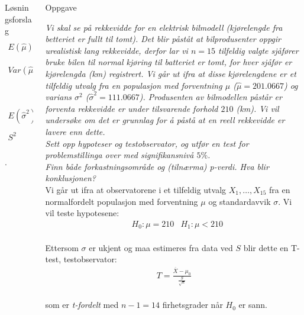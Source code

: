 \documentclass[final,hyperref={pdfpagelabels=false}]{beamer}
\newcommand{\oppgave}[2]
{\center\normalsize Oppgave\\
	{\footnotesize\raggedright \textit{#1}\\#2\\}}
\newcommand{\maths}[1]{\vspace{-3mm}\begin{align*}#1\end{align*}\\\vspace{-3mm}}
\begin{document}
\begin{frame}{}
\begin{columns}[t]
\begin{column}{.33\linewidth}
\begin{block}{Løsningsforslag}
				{\maths{E(\hat\mu)&=E\left(\frac{\sum_{i=1}^nl_iY_i}{\sum_{i=1}^nl_i}\right)=\frac{\sum_{i=1}^nl_iE(Y_i)}{\sum_{i=1}^nl_i}=\frac{\sum_{i=1}^nl_i\mu}{\sum_{i=1}^nl_i}=\mu\frac{\sum_{i=1}^nl_i}{\sum_{i=1}^nl_i}=\mu\\
						Var(\hat\mu)&=Var\left(\frac{\sum_{i=1}^nl_iY_i}{\sum_{i=1}^nl_i}\right)=\frac{\sum_{i=1}^nl_i^2Var(Y_i)}{\left(\sum_{i=1}^nl_i\right)^2}=\frac{\sum_{i=1}^nl_i^2\frac{\sigma^2}{l_i}}{\left(\sum_{i=1}^nl_i\right)^2}\\
						&=\frac{\sigma^2\sum_{i=1}^nl_i}{\left(\sum_{i=1}^nl_i\right)^2}=\frac{\sigma^2}{\sum_{i=1}^nl_i}\\
						E(\hat\sigma^2)&=E\left(\frac{n\sigma^2\hat\sigma^2}{n\sigma^2}\right)=\frac{\sigma^2}{n}E\left(\frac{n\hat\sigma^2}{\sigma^2}\right)=\sigma^2\frac{n-1}{n}\\
						S^2&=\frac{\sum_{i=1}^nl_i(Y_i-\hat\mu)^2}{n-1}}.}
			\end{block}
		\end{column}
		\begin{column}{.33\linewidth}
			\begin{block}{}
				\oppgave{Vi skal se på rekkevidde for en elektrisk bilmodell (kjørelengde fra betteriet er fullt til tomt).
					Det blir påståt at bilprodusenter oppgir urealistisk lang rekkevidde, derfor lar vi $n=15$ tilfeldig valgte sjåfører bruke bilen til normal kjøring til batteriet er tomt, for hver sjåfør er kjørelengda (km) registrert.
					Vi går ut ifra at disse kjørelengdene er et tilfeldig utvalg fra en populasjon med forventning $\mu$ ($\hat \mu=201.0667$) og varians $\sigma^2$ ($\hat \sigma^2 = 111.0667$).
					Produsenten av bilmodellen påstår er forventa rekkevidde er under tilsvarende forhold $210$ (km).
					Vi vil undersøke om det er grunnlag for å påstå at en reell rekkevidde er lavere enn dette.\\
					Sett opp hypoteser og testobservator, og utfør en test for problemstillinga over med signifikansnivå $5\%$.\\
					Finn både forkastningsområde og (tilnærma) p-verdi.
					Hva blir konklusjonen?}
				{Vi går ut ifra at observatorene i et tilfeldig utvalg $X_1,\ldots,X_{15}$ fra en normalfordelt populasjon med forventning $\mu$ og standardavvik $\sigma$.
					Vi vil teste hypotesene:
					\maths{&H_0: \mu=210 &H_1:\mu<210}
					Ettersom $\sigma$ er ukjent og maa estimeres fra data ved $S$ blir dette en T-test, testobservator:
					\maths{T=\frac{\overline X - \mu_0}{\frac{S}{\sqrt n}}}
					som er \textit{t-fordelt} med $n-1=14$ firhetsgrader når $H_0$ er sann.
}
\end{block}
\end{column}
\end{columns}
\end{frame}
\end{document}
